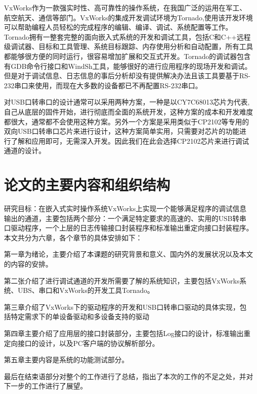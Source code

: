 	VxWorks作为一款强实时性、高可靠性的操作系统，在我国广泛的运用在军工、航空航天、通信等部门。VxWorks的集成开发调试环境为Tornado,使用该开发环境可以帮助编程人员轻松的完成程序的编辑、编译、调试、系统配置等工作。Tornado拥有一整套完整的面向嵌入式系统的开发和调试工具，包括C和C++远程级调试器、目标和工具管理、系统目标跟踪、内存使用分析和自动配置，所有工具都能够很方便的同时运行，很容易增加扩展和交互式开发。Tornado的调试器包含有GDB命令行接口和WindSh工具，能够很好的进行应用程序的现场开发和调试。但是对于调试信息、日志信息的事后分析却没有提供解决办法且该工具要基于RS-232串口来使用，而现在大多数的设备都已不再配置RS-232串口。
	
	对USB口转串口的设计通常可以采用两种方案，一种是以CY7C68013芯片为代表,自己从底层的固件开始，进行彻底而全面的系统开发，这种方案的成本和开发难度都很大，通常都不会使用这种方案。另外一个方案是采用类似于CP2102等专用的双向USB口转串口芯片来进行设计，这种方案简单实用，只需要对芯片的功能进行了解和应用即可，无需深入开发。因此我们在此会选择CP2102芯片来进行调试通道的设计。
	


\section{论文的主要内容和组织结构}	
	研究目标：在嵌入式实时操作系统VxWorks上实现一个能够满足程序的调试信息输出的通道，主要包括两个部分：一个满足特定要求的高速的、实用的USB转串口驱动程序，一个上层的日志传输接口封装程序和标准输出重定向接口封装程序。\\
 本文共分为六章，各个章节的具体安排如下：
 
 第一章为绪论，主要介绍了本课题的研究背景和意义、国内外的发展状况以及本文的内容的安排。
 
 第二张介绍了进行调试通道的开发所需要了解的系统知识，主要包括VxWorks系统、UBS、串口和VxWorks的开发工具Tornado。
 
 第三章介绍了VxWorks下的驱动程序的开发和USB口转串口驱动的具体实现，包括特定需求下的单设备驱动和多设备支持的驱动
 
 第四章主要介绍了应用层的接口封装部分，主要包括Log接口的设计，标准输出重定向接口的设计，以及PC客户端的协议解析部分。
 
 第五章主要内容是系统的功能测试部分。
 
 最后在结束语部分对整个的工作进行了总结，指出了本次的工作的不足之处，并对下一步的工作进行了展望。 
